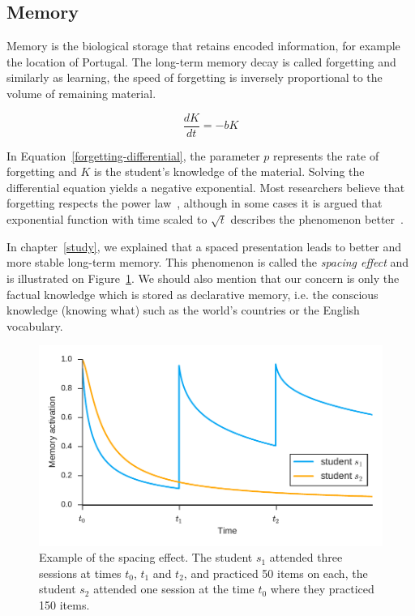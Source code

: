 \subsection{Memory}
\label{memory}

Memory is the biological storage that retains encoded information, for example the location of Portugal. The long-term memory decay is called forgetting and similarly as learning, the speed of forgetting is inversely proportional to the volume of remaining material.

\begin{equation} \label{forgetting-differential}
  \frac{dK}{dt} = -bK
\end{equation}

In Equation~\ref{forgetting-differential}, the parameter $p$ represents the rate of forgetting and $K$ is the student's knowledge of the material. Solving the differential equation yields a negative exponential. Most researchers believe that forgetting respects the power law~\cite{MichaelW.Eysenck2008, anderson2000learning}, although in some cases it is argued that exponential function with time scaled to $\sqrt{t}$ describes the phenomenon better~\cite{White2001}.

In chapter~\ref{study}, we explained that a spaced presentation leads to better and more stable long-term memory. This phenomenon is called the \textit{spacing effect} and is illustrated on Figure~\ref{fig:spacing-effect}. We should also mention that our concern is only the factual knowledge which is stored as declarative memory, i.e. the conscious knowledge (knowing what) such as the world's countries or the English vocabulary.

\begin{figure}[htbp]
  \centering
  \includegraphics[width=\textwidth]{img/spacing-effect}
  \caption{Example of the spacing effect. The student $s_1$ attended three sessions at times $t_0$, $t_1$ and $t_2$, and practiced 50 items on each, the student $s_2$ attended one session at the time $t_0$ where they practiced 150 items.}
  \label{fig:spacing-effect}
\end{figure}


